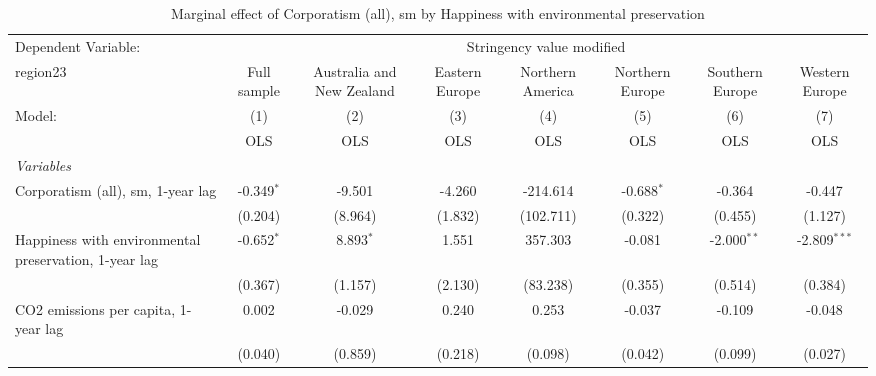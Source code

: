 
\begin{table}[htbp]
   \caption{Marginal effect of Corporatism (all), sm by Happiness with environmental preservation}
   \centering
   \begin{tabular}{lccccccc}
      \toprule
      Dependent Variable: & \multicolumn{7}{c}{Stringency value modified}\\
      region23                                                                                  & Full sample   & Australia and New Zealand & Eastern Europe & Northern America & Northern Europe & Southern Europe & Western Europe \\   
      Model:                                                                                    & (1)           & (2)                       & (3)            & (4)              & (5)             & (6)             & (7)\\  
                                                                                                &  OLS          & OLS                       & OLS            & OLS              & OLS             & OLS             & OLS\\  
      \midrule
      \emph{Variables}\\
      Corporatism (all), sm, 1-year lag                                                         & -0.349$^{*}$  & -9.501                    & -4.260         & -214.614         & -0.688$^{*}$    & -0.364          & -0.447\\   
                                                                                                & (0.204)       & (8.964)                   & (1.832)        & (102.711)        & (0.322)         & (0.455)         & (1.127)\\   
      Happiness with environmental preservation, 1-year lag                                     & -0.652$^{*}$  & 8.893$^{*}$               & 1.551          & 357.303          & -0.081          & -2.000$^{**}$   & -2.809$^{***}$\\   
                                                                                                & (0.367)       & (1.157)                   & (2.130)        & (83.238)         & (0.355)         & (0.514)         & (0.384)\\   
      CO2 emissions per capita, 1-year lag                                                      & 0.002         & -0.029                    & 0.240          & 0.253            & -0.037          & -0.109          & -0.048\\   
                                                                                                & (0.040)       & (0.859)                   & (0.218)        & (0.098)          & (0.042)         & (0.099)         & (0.027)\\   

\end{tabular}
\end{table}
